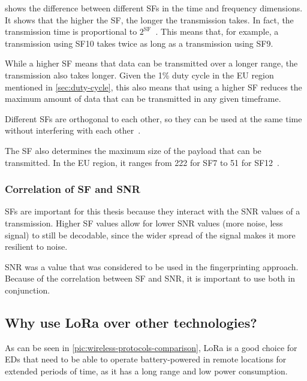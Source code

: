  shows the difference between different \aclp{SF} in the time and frequency dimensions.
It shows that the higher the \ac{SF}, the longer the transmission takes.
In fact, the transmission time is proportional to $2^{\text{SF}}$~\cite{sakshama_ghoslya_lora_2017}.
This means that, for example, a transmission using \ac{SF}10 takes twice as long as a transmission using \ac{SF}9.

While a higher \acl{SF} means that data can be transmitted over a longer range, the transmission also takes longer.
Given the 1\% duty cycle in the \ac{EU} region mentioned in \cref{sec:duty-cycle}, this also means that using a higher \acl{SF} reduces the maximum amount of data that can be transmitted in any given timeframe.

Different \aclp{SF} are orthogonal to each other, so they can be used at the same time without interfering with each other~\cite{the_things_network_spreading_2023}.

The \ac{SF} also determines the maximum size of the payload that can be transmitted.
In the \ac{EU} region, it ranges from \SI{222}{\byte} for \ac{SF}7 to \SI{51}{\byte} for \ac{SF}12~\cite[p. 10f]{lora_alliance_inc_lorawan_regional_2017}.

\subsubsection{Correlation of \acs{SF} and \acs{SNR}}\label{sec:sf-snr-correlation}

\aclp{SF} are important for this thesis because they interact with the \ac{SNR} values of a transmission.
Higher \ac{SF} values allow for lower \ac{SNR} values (more noise, less signal) to still be decodable, since the wider spread of the signal makes it more resilient to noise.

\ac{SNR} was a value that was considered to be used in the fingerprinting approach.
Because of the correlation between \acl{SF} and \acl{SNR}, it is important to use both in conjunction.

\subsection{Why use \acs{LoRa} over other technologies?}

As can be seen in \cref{pic:wireless-protocols-comparison}, \ac{LoRa} is a good choice for \aclp{ED} that need to be able to operate battery-powered in remote locations for extended periods of time, as it has a long range and low power consumption.

